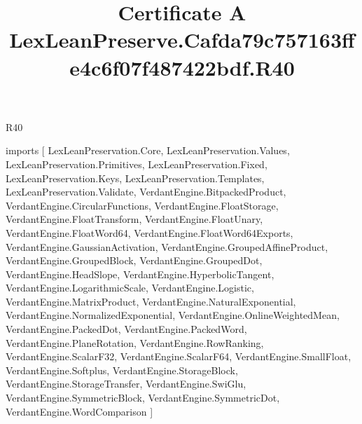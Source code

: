 \begin{lexlean}{R40}
\title{Certificate A LexLeanPreserve.Cafda79c757163ffe4c6f07f487422bdf.R40}
\begin{coremodule}
imports [
  LexLeanPreservation.Core,
  LexLeanPreservation.Values,
  LexLeanPreservation.Primitives,
  LexLeanPreservation.Fixed,
  LexLeanPreservation.Keys,
  LexLeanPreservation.Templates,
  LexLeanPreservation.Validate,
  VerdantEngine.BitpackedProduct,
  VerdantEngine.CircularFunctions,
  VerdantEngine.FloatStorage,
  VerdantEngine.FloatTransform,
  VerdantEngine.FloatUnary,
  VerdantEngine.FloatWord64,
  VerdantEngine.FloatWord64Exports,
  VerdantEngine.GaussianActivation,
  VerdantEngine.GroupedAffineProduct,
  VerdantEngine.GroupedBlock,
  VerdantEngine.GroupedDot,
  VerdantEngine.HeadSlope,
  VerdantEngine.HyperbolicTangent,
  VerdantEngine.LogarithmicScale,
  VerdantEngine.Logistic,
  VerdantEngine.MatrixProduct,
  VerdantEngine.NaturalExponential,
  VerdantEngine.NormalizedExponential,
  VerdantEngine.OnlineWeightedMean,
  VerdantEngine.PackedDot,
  VerdantEngine.PackedWord,
  VerdantEngine.PlaneRotation,
  VerdantEngine.RowRanking,
  VerdantEngine.ScalarF32,
  VerdantEngine.ScalarF64,
  VerdantEngine.SmallFloat,
  VerdantEngine.Softplus,
  VerdantEngine.StorageBlock,
  VerdantEngine.StorageTransfer,
  VerdantEngine.SwiGlu,
  VerdantEngine.SymmetricBlock,
  VerdantEngine.SymmetricDot,
  VerdantEngine.WordComparison
]


\end{coremodule}
\end{lexlean}
